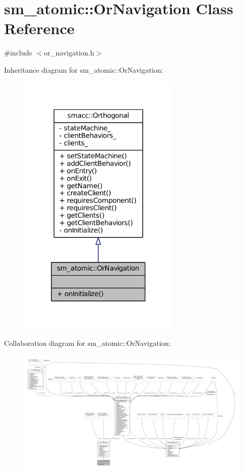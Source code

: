 \hypertarget{classsm__atomic_1_1OrNavigation}{}\section{sm\+\_\+atomic\+:\+:Or\+Navigation Class Reference}
\label{classsm__atomic_1_1OrNavigation}


{\ttfamily \#include $<$or\+\_\+navigation.\+h$>$}



Inheritance diagram for sm\+\_\+atomic\+:\+:Or\+Navigation\+:
\nopagebreak
\begin{figure}[H]
\begin{center}
\leavevmode
\includegraphics[width=218pt]{classsm__atomic_1_1OrNavigation__inherit__graph}
\end{center}
\end{figure}


Collaboration diagram for sm\+\_\+atomic\+:\+:Or\+Navigation\+:
\nopagebreak
\begin{figure}[H]
\begin{center}
\leavevmode
\includegraphics[width=350pt]{classsm__atomic_1_1OrNavigation__coll__graph}
\end{center}
\end{figure}
